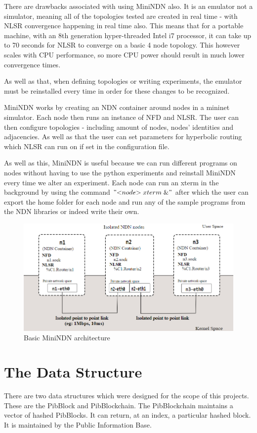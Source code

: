  There are drawbacks associated with using MiniNDN also. It is an emulator not a simulator, meaning all of the topologies tested are created in real time - with NLSR convergence happening in real time also. This means that for a portable machine, with an 8th generation hyper-threaded Intel i7 processor, it can take up to 70 seconds for NLSR to converge on a basic 4 node topology. This however scales with CPU performance, so more CPU power should result in much lower convergence times. 
 
 As well as that, when defining topologies or writing experiments, the emulator must be reinstalled every time in order for these changes to be recognized.
 
 MiniNDN works by creating an NDN container around nodes in a mininet simulator. Each node then runs an instance of NFD and NLSR. The user can then configure topologies - including amount of nodes, nodes' identities and adjacencies. As well as that the user can set parameters for hyperbolic routing which NLSR can run on if set in the configuration file. 
 
 As well as this, MiniNDN is useful because we can run different programs on nodes without having to use the python experiments and reinstall MiniNDN every time we alter an experiment. Each node can run an xterm in the background by using the command $"{<}node{>} \; xterm \; \& "$ after which the user can export the home folder for each node and run any of the sample programs from the NDN libraries or indeed write their own. 
\begin{figure}

\includegraphics[width=6in]{minindn}
\caption{Basic MiniNDN architecture}
\end{figure}

\section{The Data Structure}
There are two data structures which were designed for the scope of this projects. These are the PibBlock and PibBlockchain. The PibBlockchain maintains a vector of hashed PibBlocks. It can return, at an index, a particular hashed block. It is maintained by the Public Information Base. 

